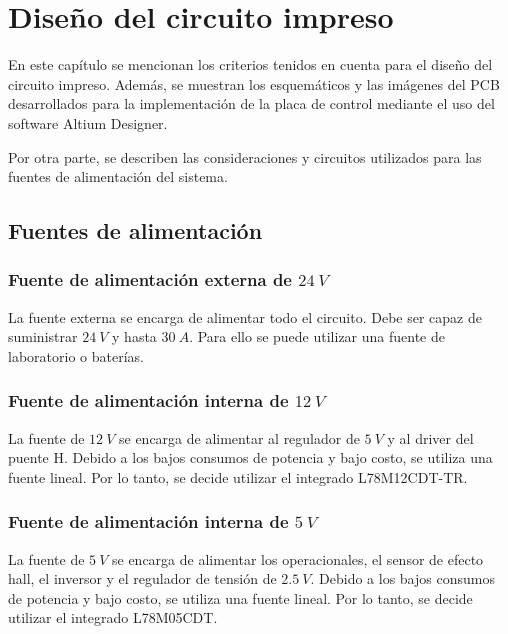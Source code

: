 \chapter{Diseño del circuito impreso}  \label{cap:PCB}

En este capítulo se mencionan los criterios tenidos en cuenta para el diseño del circuito impreso. Además, se muestran los esquemáticos y las imágenes del PCB desarrollados para la implementación de la placa de control mediante el uso del software Altium Designer. 

Por otra parte, se describen las consideraciones y circuitos utilizados para las fuentes de alimentación del sistema.



\section{Fuentes de alimentación}

\subsection{Fuente de alimentación externa de $24\:V$}

\noindent La fuente externa se encarga de alimentar todo el circuito. Debe ser capaz de suministrar $24\:V$ y hasta $30\:A$. Para ello se puede utilizar una fuente de laboratorio o baterías.

\subsection{Fuente de alimentación interna de $12\:V$}

\noindent La fuente de $12\:V$ se encarga de alimentar al regulador de $5\:V$ y al driver del puente H. Debido a los bajos consumos de potencia y bajo costo, se utiliza una fuente lineal. Por lo tanto, se decide utilizar el integrado L78M12CDT-TR.

\subsection{Fuente de alimentación interna de $5\:V$}

La fuente de $5\:V$ se encarga de alimentar los operacionales, el sensor de efecto hall, el inversor y el regulador de tensión de $2.5\:V$. Debido a los bajos consumos de potencia y bajo costo, se utiliza una fuente lineal. Por lo tanto, se decide utilizar el integrado L78M05CDT.

